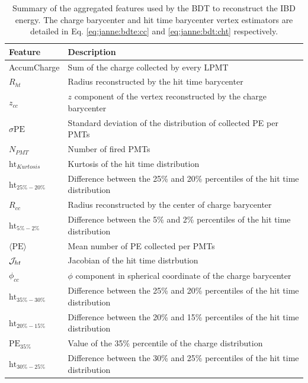 \documentclass[../main.tex]{subfiles}
\begin{document}
\begin{table}[ht]
  \centering
  \begin{tabular}{|l | l|}
    \hline
    Feature & Description \\
    \hline
    AccumCharge             & Sum of the charge collected by every LPMT \\
    $R_{ht}               $ & Radius reconstructed by the hit time barycenter  \\
    $z_{cc}               $ & $z$ component of the vertex reconstructed by the charge barycenter \\
    $\sigma \text{PE}     $ & Standard deviation of the distribution of collected PE per PMTs \\
    $N_{PMT}              $ & Number of fired PMTs \\
    $\text{ht}_{Kurtosis} $ & Kurtosis of the hit time distribution \\
    $\text{ht}_{25\%-20\%}$ & Difference between the 25\% and 20\% percentiles of the hit time distribution \\
    $R_{cc}               $ & Radius reconstructed by the center of charge barycenter \\
    $\text{ht}_{5\%-2\%}  $ & Difference between the 5\% and 2\% percentiles of the hit time distribution \\
    $\langle \text{PE} \rangle$ & Mean number of PE collected per PMTs \\
    ${\cal J}_{ht}        $ & Jacobian of the hit time distrbution \\
    $\phi_{cc}            $ & $\phi$ component in spherical coordinate of the charge barycenter \\
    $\text{ht}_{35\%-30\%}$ & Difference between the 25\% and 20\% percentiles of the hit time distribution \\
    $\text{ht}_{20\%-15\%}$ & Difference between the 20\% and 15\% percentiles of the hit time distribution \\
    $\text{PE}_{35\%}     $ & Value of the 35\% percentile of the charge distribution \\
    $\text{ht}_{30\%-25\%}$ & Difference between the 30\% and 25\% percentiles of the hit time distribution \\
    \hline
  \end{tabular}
  \caption{Summary of the aggregated features used by the BDT to reconstruct the IBD energy. The charge barycenter and hit time barycenter vertex estimators are detailed in Eq. \ref{eq:janne:bdte:cc} and \ref{eq:janne:bdt:cht} respectively.}
  \label{tab:janne:bdte:features}
\end{table}
\end{document}
